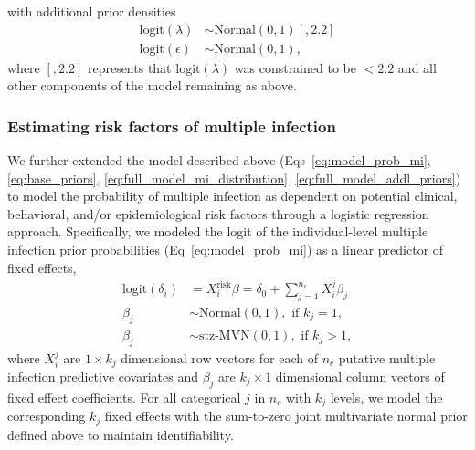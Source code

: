 \documentclass[10pt,letterpaper]{article}
\begin{document}
with additional prior densities
\begin{subequations}
\label{eq:full_model_addl_priors}
\begin{align}
\text{logit}(\lambda) &\sim \text{Normal}(0,1)[,2.2] \\
\text{logit}(\epsilon) &\sim \text{Normal}(0,1),
\end{align}
\end{subequations}
where $[,2.2]$ represents that $\text{logit}(\lambda)$ was constrained to be $<2.2$ and all other components of the model remaining as above.


\subsubsection{Estimating risk factors of multiple infection}
\label{sec:extended_model}
We further extended the model described above (Eqs~\ref{eq:model_prob_mi}, \ref{eq:base_priors}, \ref{eq:full_model_mi_distribution}, \ref{eq:full_model_addl_priors}) to model the probability of multiple infection as dependent on potential clinical, behavioral, and/or epidemiological risk factors through a logistic regression approach. Specifically, we modeled the logit of the individual-level multiple infection prior probabilities (Eq~\ref{eq:model_prob_mi}) as a linear predictor of fixed effects,
\begin{subequations}
\label{eq:delta_i_covariates}
\begin{align}
\text{logit}\left(\delta_i\right) &= X_i^{\text{risk}}\beta = \delta_0 + \sum_{j=1}^{n_c}X_i^j \beta_j\\
\beta_j &\sim \text{Normal}(0,1), \text{ if } k_j = 1,\\
\beta_j &\sim \text{stz-MVN}(0,1), \text{ if } k_j > 1,
\end{align}
\end{subequations}
where $X^j_i$ are $1 \times k_j$ dimensional row vectors for each of $n_c$ putative multiple infection predictive covariates and $\beta_j$ are $k_j \times 1$ dimensional column vectors of fixed effect coefficients. For all categorical $j$ in $n_c$ with $k_j$ levels, we model the corresponding $k_j$ fixed effects with the sum-to-zero joint multivariate normal prior defined above to maintain identifiability.\par
%
%
\end{document}
